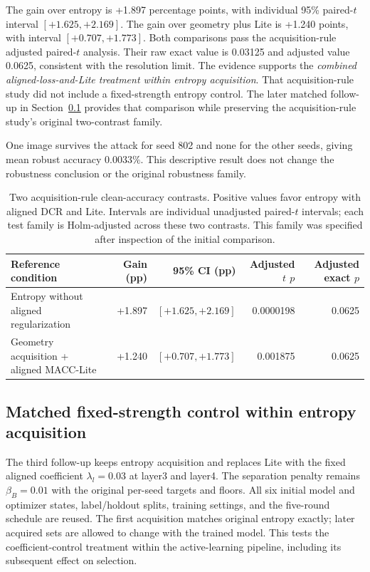 \documentclass[a4paper,fleqn]{cas-dc}
\let\CAENLcaption\caption
\let\caption\CAENLcaption
\begin{document}
The gain over entropy is +1.897 percentage points, with individual
95\% paired-$t$ interval $[+1.625,+2.169]$. The gain over geometry plus
Lite is +1.240 points, with interval $[+0.707,+1.773]$. Both comparisons
pass the acquisition-rule adjusted paired-$t$ analysis. Their raw exact value is 0.03125 and adjusted value
0.0625, consistent with the resolution limit.
The evidence supports the \emph{combined aligned-loss-and-Lite
treatment within entropy acquisition}.
That acquisition-rule study did not include a fixed-strength entropy
control. The later matched follow-up in Section~\ref{sec:entropy_fixed}
provides that comparison while preserving the acquisition-rule study's
original two-contrast family.

One image survives the attack for seed 802 and none for the
other seeds, giving mean robust accuracy $0.0033\%$.
This descriptive result does not change the robustness
conclusion or the original robustness family.


\begin{table}[pos=tbp]
\caption{Two acquisition-rule clean-accuracy contrasts.
Positive values favor entropy with aligned DCR and Lite.
Intervals are individual unadjusted paired-$t$ intervals;
each test family is Holm-adjusted across these two contrasts.
This family was specified after inspection of the initial comparison.}
\label{tab:entropy_lite_supplement}
\centering\small
\begin{tabularx}{\textwidth}{@{}Yrrrr@{}}
\toprule
Reference condition & Gain (pp) & 95\% CI (pp) &
Adjusted $t$ $p$ & Adjusted exact $p$ \\
\midrule
Entropy without aligned regularization &
+1.897 & $[+1.625,+2.169]$ & 0.0000198 & 0.0625 \\
Geometry acquisition + aligned MACC-Lite &
+1.240 & $[+0.707,+1.773]$ & 0.001875 & 0.0625 \\
\bottomrule
\end{tabularx}
\end{table}


\subsection{Matched fixed-strength control within entropy acquisition}
\label{sec:entropy_fixed}

The third follow-up keeps entropy acquisition and replaces Lite with
the fixed aligned coefficient $\lambda_l=0.03$ at layer3 and layer4.
The separation penalty remains $\beta_B=0.01$ with the original
per-seed targets and floors. All six initial model and optimizer states,
label/holdout splits, training settings, and the five-round schedule are
reused. The first acquisition matches original entropy exactly; later
acquired sets are allowed to change with the trained model. This tests
the coefficient-control treatment within the active-learning pipeline,
including its subsequent effect on selection.
\end{document}
